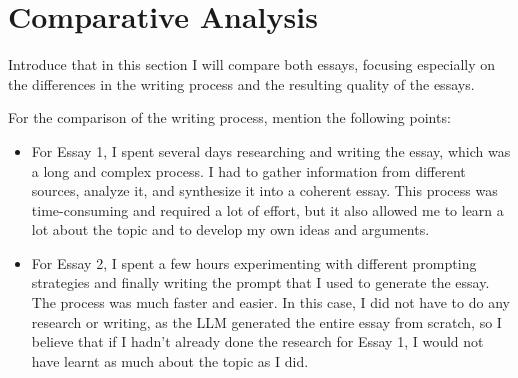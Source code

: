 \documentclass[11pt,a4paper]{article}
\begin{document}
\section{Comparative Analysis}

Introduce that in this section I will compare both essays, focusing especially on the differences in the writing process and the resulting quality of the essays.

For the comparison of the writing process, mention the following points:
\begin{itemize}
    \item For Essay 1, I spent several days researching and writing the essay, which was a long and complex process. I had to gather information from different sources, analyze it, and synthesize it into a coherent essay. This process was time-consuming and required a lot of effort, but it also allowed me to learn a lot about the topic and to develop my own ideas and arguments.
    \item For Essay 2, I spent a few hours experimenting with different prompting strategies and finally writing the prompt that I used to generate the essay. The process was much faster and easier. In this case, I did not have to do any research or writing, as the LLM generated the entire essay from scratch, so I believe that if I hadn't already done the research for Essay 1, I would not have learnt as much about the topic as I did.
\end{itemize}
\end{document}
